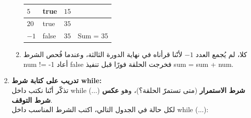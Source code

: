 \documentclass[14pt]{extarticle}
\begin{document}
\begin{enumerate}[itemsep=2em]
\begin{boxSolution}
\begin{enumerate}
\begin{center}
\begin{english}
\begin{tabular}{|C{2.5cm}|C{3.5cm}|C{2.5cm}|C{3.5cm}|}
    $5$ & \textenglish{true} & $15$ & \\ \hline
    $20$ & \textenglish{true} & $35$ & \\ \hline
    $-1$ & \textenglish{false} & $35$ & \textenglish{Sum = 35} \\ \hline
    \end{tabular}
    \end{english}
    \end{center}
    \item كلا، لم يُجمع العدد $-1$ لأنّنا قرأناه في نهاية الدورة الثالثة، وعندما فُحص الشرط \textenglish{num != -1} أعاد \textenglish{false} فخرجت الحلقة فورًا قبل تنفيذ \textenglish{sum = sum + num}.
\end{enumerate}
\end{boxSolution}
\fi
\filbreak

\item \textbf{تدريب على كتابة شرط \textenglish{while}:} \\
تذكّر أنّنا نكتب داخل \textenglish{while (...)} \textbf{شرط الاستمرار} (متى تستمرّ الحلقة؟)، وهو \textbf{عكس شرط التوقف}. \\
لكل حالة في الجدول التالي، اكتب الشرط المناسب داخل \textenglish{while (...)}:


\end{enumerate}
\end{document}
